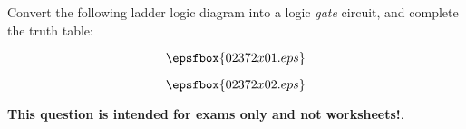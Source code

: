 

Convert the following ladder logic diagram into a logic {\it gate} circuit, and complete the truth table:

$$\epsfbox{02372x01.eps}$$







$$\epsfbox{02372x02.eps}$$







{\bf This question is intended for exams only and not worksheets!}.




